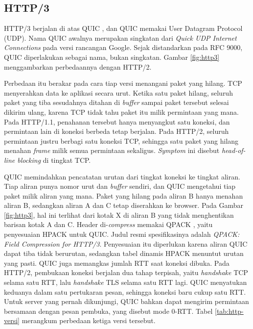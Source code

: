 \subsection*{HTTP/3}

HTTP/3 \cite{rfc9114} berjalan di atas QUIC \cite{rfc9000}, dan QUIC memakai
User Datagram Protocol (UDP). Nama QUIC awalnya merupakan singkatan dari
\textit{Quick UDP Internet Connections} pada versi rancangan Google. Sejak
distandarkan pada RFC 9000, QUIC diperlakukan sebagai nama, bukan singkatan.
Gambar \ref{fig:http3} menggambarkan perbedaannya dengan HTTP/2.

Perbedaan itu berakar pada cara tiap versi menangani paket yang hilang. TCP
menyerahkan data ke aplikasi secara urut. Ketika satu paket hilang, seluruh
paket yang tiba sesudahnya ditahan di \textit{buffer} sampai paket tersebut
selesai dikirim ulang, karena TCP tidak tahu paket itu milik permintaan yang
mana. Pada HTTP/1.1, penahanan tersebut hanya menyangkut satu koneksi, dan
permintaan lain di koneksi berbeda tetap berjalan. Pada HTTP/2, seluruh permintaan justru
berbagi satu koneksi TCP, sehingga satu paket yang hilang menahan
\textit{frame} milik semua permintaan sekaligus. \textit{Symptom} ini disebut
\textit{head-of-line blocking} di tingkat TCP.

QUIC memindahkan pencatatan urutan dari tingkat koneksi ke tingkat aliran.
Tiap aliran punya nomor urut dan \textit{buffer} sendiri, dan QUIC mengetahui
tiap paket milik aliran yang mana. Paket yang hilang pada aliran B hanya menahan
aliran B, sedangkan aliran A dan C tetap diserahkan ke browser. Pada Gambar
\ref{fig:http3}, hal ini terlihat dari kotak X di aliran B yang tidak
menghentikan barisan kotak A dan C.
Header di-\textit{compress} memakai QPACK \cite{rfc9204}, yaitu penyesuaian HPACK untuk
QUIC. Judul resmi spesifikasinya adalah \textit{QPACK: Field Compression for
HTTP/3}. Penyesuaian itu diperlukan karena aliran QUIC dapat tiba tidak
berurutan, sedangkan tabel dinamis HPACK menuntut urutan yang pasti. QUIC juga
memangkas jumlah RTT saat koneksi dibuka. Pada HTTP/2, pembukaan koneksi
berjalan dua tahap terpisah, yaitu \textit{handshake} TCP selama satu RTT, lalu
\textit{handshake} TLS selama satu RTT lagi. QUIC menyatukan keduanya dalam satu
pertukaran pesan, sehingga koneksi baru cukup satu RTT. Untuk server yang pernah
dikunjungi, QUIC bahkan dapat mengirim permintaan bersamaan dengan pesan
pembuka, yang disebut mode 0-RTT. Tabel \ref{tab:http-versi} merangkum perbedaan
ketiga versi tersebut.

